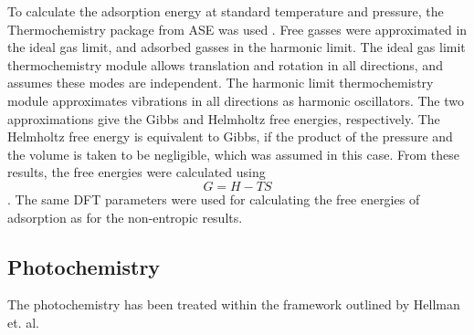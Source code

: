 \documentclass[catalysts,article,submit,moreauthors,pdftex,10pt,a4paper]{mdpi}
\theoremstyle{mdpi}
\newcounter{re}
\theoremstyle{mdpidefinition}
\begin{document}
To calculate the adsorption energy at standard temperature and pressure, the Thermochemistry package from ASE was used \cite{ase-paper}. Free gasses were approximated in the ideal gas limit, and adsorbed gasses in the harmonic limit. The ideal gas limit thermochemistry module allows translation and rotation in all directions, and assumes these modes are independent. The harmonic limit thermochemistry module approximates vibrations in all directions as harmonic oscillators. The two approximations give the Gibbs and Helmholtz free energies, respectively. The Helmholtz free energy is equivalent to Gibbs, if the product of the pressure and the volume is taken to be negligible, which was assumed in this case. From these results, the free energies were calculated using \begin{equation}
    G=H-TS
\end{equation}. The same DFT parameters were used for calculating the free energies of adsorption as for the non-entropic results.

\subsection{Photochemistry}
The photochemistry has been treated within the framework outlined by Hellman et. al. \cite{Hellman2017} 




\end{document}
